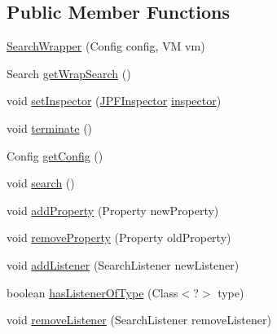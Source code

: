 \subsection*{Public Member Functions}
\begin{DoxyCompactItemize}
\item 
\hyperlink{classgov_1_1nasa_1_1jpf_1_1inspector_1_1server_1_1jpf_1_1_search_wrapper_abf460a9b5ace43a996e484bf96f51673}{Search\+Wrapper} (Config config, VM vm)
\item 
Search \hyperlink{classgov_1_1nasa_1_1jpf_1_1inspector_1_1server_1_1jpf_1_1_search_wrapper_aabc1c678ea8c24dd60788589f1825502}{get\+Wrap\+Search} ()
\item 
void \hyperlink{classgov_1_1nasa_1_1jpf_1_1inspector_1_1server_1_1jpf_1_1_search_wrapper_ab93e60e4c198bbe63806995580d3ea67}{set\+Inspector} (\hyperlink{classgov_1_1nasa_1_1jpf_1_1inspector_1_1server_1_1jpf_1_1_j_p_f_inspector}{J\+P\+F\+Inspector} \hyperlink{classgov_1_1nasa_1_1jpf_1_1inspector_1_1server_1_1jpf_1_1_search_wrapper_ab36c021b698a215395d5ea85b8036b3c}{inspector})
\item 
void \hyperlink{classgov_1_1nasa_1_1jpf_1_1inspector_1_1server_1_1jpf_1_1_search_wrapper_a2368d7c9f74aa0574e64e0fd3e7a4bf1}{terminate} ()
\item 
Config \hyperlink{classgov_1_1nasa_1_1jpf_1_1inspector_1_1server_1_1jpf_1_1_search_wrapper_a14f83e0fd1c8a05d44f784c353e05261}{get\+Config} ()
\item 
void \hyperlink{classgov_1_1nasa_1_1jpf_1_1inspector_1_1server_1_1jpf_1_1_search_wrapper_ae46e0c0a356fe88167f587b651343b42}{search} ()
\item 
void \hyperlink{classgov_1_1nasa_1_1jpf_1_1inspector_1_1server_1_1jpf_1_1_search_wrapper_a902749af26777ca289926e75d0ff2045}{add\+Property} (Property new\+Property)
\item 
void \hyperlink{classgov_1_1nasa_1_1jpf_1_1inspector_1_1server_1_1jpf_1_1_search_wrapper_a924d4e3f4479485a36aa9aee0e08cb95}{remove\+Property} (Property old\+Property)
\item 
void \hyperlink{classgov_1_1nasa_1_1jpf_1_1inspector_1_1server_1_1jpf_1_1_search_wrapper_a86d486e1621bd8fd8c43dce976dff8a4}{add\+Listener} (Search\+Listener new\+Listener)
\item 
boolean \hyperlink{classgov_1_1nasa_1_1jpf_1_1inspector_1_1server_1_1jpf_1_1_search_wrapper_af00a2e0e86af353e8965278b07189d14}{has\+Listener\+Of\+Type} (Class$<$?$>$ type)
\item 
void \hyperlink{classgov_1_1nasa_1_1jpf_1_1inspector_1_1server_1_1jpf_1_1_search_wrapper_af34dd3e92a28014345b8a093331ef9ab}{remove\+Listener} (Search\+Listener remove\+Listener)

\end{DoxyCompactItemize}
